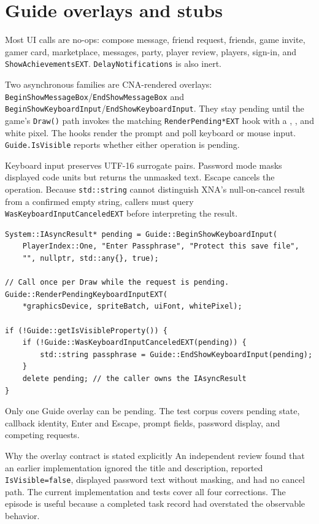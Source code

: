 \section{Guide overlays and stubs}

Most  UI calls are no-ops: compose message, friend request, friends, game
invite, gamer card, marketplace, messages, party, player review, players, sign-in, and
\texttt{ShowAchievementsEXT}. \texttt{DelayNotifications} is also inert.

Two asynchronous families are CNA-rendered overlays:
\texttt{BeginShowMessageBox}/\texttt{EndShowMessageBox} and
\texttt{BeginShowKeyboardInput}/\texttt{EndShowKeyboardInput}. They stay pending until the
game's \texttt{Draw()} path invokes the matching \texttt{RenderPending*EXT} hook with a
, , and white pixel. The hooks render the prompt and
poll keyboard or mouse input. \texttt{Guide.IsVisible} reports whether either operation is
pending.

Keyboard input preserves UTF-16 surrogate pairs. Password mode masks displayed code units but
returns the unmasked text. Escape cancels the operation. Because \texttt{std::string} cannot
distinguish XNA's null-on-cancel result from a confirmed empty string, callers must query
\texttt{WasKeyboardInputCanceledEXT} before interpreting the result.

\begin{lstlisting}
System::IAsyncResult* pending = Guide::BeginShowKeyboardInput(
    PlayerIndex::One, "Enter Passphrase", "Protect this save file",
    "", nullptr, std::any{}, true);

// Call once per Draw while the request is pending.
Guide::RenderPendingKeyboardInputEXT(
    *graphicsDevice, spriteBatch, uiFont, whitePixel);

if (!Guide::getIsVisibleProperty()) {
    if (!Guide::WasKeyboardInputCanceledEXT(pending)) {
        std::string passphrase = Guide::EndShowKeyboardInput(pending);
    }
    delete pending; // the caller owns the IAsyncResult
}
\end{lstlisting}

Only one Guide overlay can be pending. The test corpus covers pending state, callback identity,
Enter and Escape, prompt fields, password display, and competing requests.

\begin{historynote}{Why the overlay contract is stated explicitly}
An independent review found that an earlier implementation ignored the title and description,
reported \texttt{IsVisible=false}, displayed password text without masking, and had no cancel
path. The current implementation and tests cover all four corrections. The episode is useful
because a completed task record had overstated the observable behavior.
\end{historynote}

